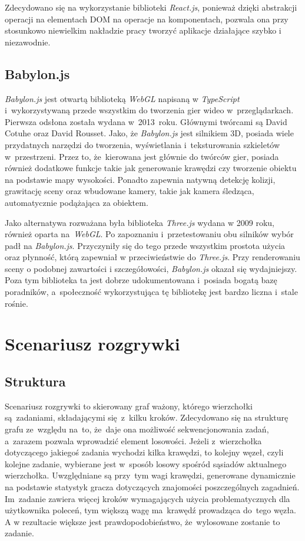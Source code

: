 \documentclass[12pt,a4paper,polish,thesis]{dcsbook}
\begin{document}
{   Zdecydowano się na wykorzystanie biblioteki \textit{React.js}, ponieważ dzięki abstrakcji operacji na elementach DOM na operacje na komponentach, pozwala ona przy stosunkowo niewielkim nakładzie pracy tworzyć aplikacje działające szybko i niezawodnie.

	\subsection{Babylon.js}

	\textit{Babylon.js} jest otwartą biblioteką \textit{WebGL} napisaną w \textit{TypeScript} i~wykorzystywaną przede wszystkim do tworzenia gier wideo w~przeglądarkach. Pierwsza odsłona została wydana w~2013~roku. Głównymi twórcami są David Cotuhe oraz David Rousset. Jako, że \textit{Babylon.js} jest silnikiem 3D, posiada wiele przydatnych narzędzi do tworzenia, wyświetlania i~teksturowania szkieletów w~przestrzeni. Przez to, że~kierowana jest głównie do twórców gier, posiada również dodatkowe funkcje takie jak generowanie krawędzi czy tworzenie obiektu na podstawie mapy wysokości. Ponadto zapewnia natywną detekcję kolizji, grawitację sceny oraz wbudowane kamery, takie jak kamera śledząca, automatycznie podążająca za obiektem.

	Jako alternatywa rozważana była biblioteka \textit{Three.js} wydana w 2009 roku, również oparta na~\textit{WebGL}. Po zapoznaniu i~przetestowaniu obu silników wybór padł na \textit{Babylon.js}. Przyczyniły się do tego przede wszystkim prostota użycia oraz płynność, którą zapewniał w przeciwieństwie do \textit{Three.js}. Przy renderowaniu sceny o podobnej zawartości i szczegółowości, \textit{Babylon.js} okazał się wydajniejszy. Poza tym biblioteka ta jest dobrze udokumentowana i~posiada bogatą bazę poradników, a~społeczność wykorzystująca tę bibliotekę jest bardzo liczna i~stale rośnie.

	\section{Scenariusz rozgrywki}

	\subsection{Struktura} \label{Struktura}

	Scenariusz rozgrywki to skierowany graf ważony, którego wierzchołki są~zadaniami, składającymi się~z~kilku kroków. Zdecydowano się na strukturę grafu ze~względu na~to, że~daje ona możliwość sekwencjonowania zadań, a~zarazem pozwala wprowadzić element losowości. Jeżeli z~wierzchołka dotyczącego jakiegoś zadania wychodzi kilka krawędzi, to kolejny węzeł, czyli kolejne zadanie, wybierane jest w~sposób losowy spośród sąsiadów aktualnego wierzchołka. Uwzględniane są przy~tym wagi krawędzi, generowane dynamicznie na podstawie statystyk gracza dotyczących znajomości poszczególnych zagadnień. Im~zadanie zawiera więcej kroków wymagających użycia problematycznych dla użytkownika poleceń, tym większą wagę ma~krawędź prowadząca do~tego węzła. A w rezultacie większe jest prawdopodobieństwo, że~wylosowane zostanie to zadanie.
	
}
\end{document}
